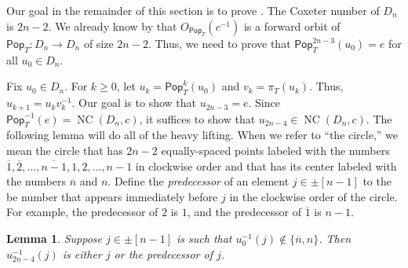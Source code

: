 \documentclass[10pt,a4paper]{amsart}
\newtheorem{lemma}[lemma]{Lemma}
\newcommand{\darkblue}{\color{darkblue}}
\newcommand{\defn}[1]{\emph{\darkblue #1}}
\newcommand{\pop}{\mathsf{Pop}}
\DeclareMathOperator{\NC}{NC}
\begin{document}
Our goal in the remainder of this section is to prove . The Coxeter number of $D_n$ is $2n{-}2$. We already know by  that $O_{\pop_T}(c^{-1})$ is a forward orbit of $\pop_T:D_n\to D_n$ of size $2n{-}2$. Thus, we need to prove that $\pop_T^{2n-3}(u_0)=e$ for all $u_0\in D_n$. 

Fix $u_0\in D_n$. For $k\geq 0$, let $u_k=\pop_T^k(u_0)$ and $v_k=\pi_T(u_k)$. Thus, $u_{k+1}=u_kv_k^{-1}$. Our goal is to show that $u_{2n-3}=e$. Since $\pop_T^{-1}(e)=\NC(D_n,c)$, it suffices to show that $u_{2n-4}\in\NC(D_n,c)$. The following lemma will do all of the heavy lifting. When we refer to ``the circle,'' we mean the circle that has $2n{-}2$ equally-spaced points labeled with the numbers $\overline 1,\overline 2,\ldots,\overline{n-1},1,2,\ldots,n-1$ in clockwise order and that has its center labeled with the numbers $\overline n$ and $n$. Define the \defn{predecessor} of an element $j\in\pm[n-1]$ to the be number that appears immediately before $j$ in the clockwise order of the circle. For example, the predecessor of $2$ is $1$, and the predecessor of $\overline 1$ is $n-1$.  

\begin{lemma}\label{lem:DMainLemma}
Suppose $j\in\pm[n-1]$ is such that $u_0^{-1}(j)\not\in\{\overline n,n\}$. Then $u_{2n-4}^{-1}(j)$ is either $j$ or the predecessor of $j$. 
\end{lemma}
\end{document}
